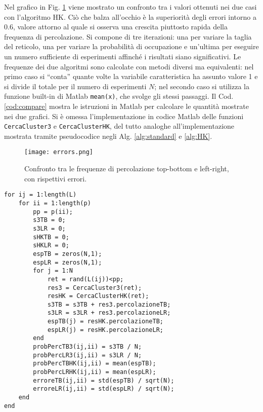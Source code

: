 Nel grafico in Fig. \ref{fig:th_errors} viene mostrato un confronto tra i valori 
ottenuti nei due casi con l'algoritmo HK. Ciò che balza all'occhio è la 
superiorità degli errori intorno a $0.6$, valore attorno al quale 
si osserva una crescita piuttosto rapida della frequenza di percolazione.
Si compone di tre iterazioni: una per variare la 
taglia del reticolo, una per variare la probabilità di occupazione e un'ultima per 
eseguire un numero sufficiente di esperimenti affinché i risultati siano significativi.
Le frequenze dei due algoritmi sono calcolate con metodi diversi ma equivalenti:
nel primo caso si ``conta'' quante volte la variabile caratteristica ha assunto valore 1
e si divide il totale per il numero di esperimenti $N$; nel secondo caso si utilizza la 
funzione built-in di Matlab \texttt{mean(x)}, che svolge gli stessi passaggi.
Il Cod. \ref{cod:compare} mostra le istruzioni in Matlab per calcolare le quantità 
mostrate nei due grafici. Si è omessa l'implementazione in codice Matlab delle funzioni 
\texttt{CercaCluster3} e \texttt{CercaClusterHK}, del tutto analoghe all'implementazione 
mostrata tramite pseudocodice negli Alg. \ref{alg:standard} e \ref{alg:HK}. \\


\begin{figure}[ht]
    \texttt{[image: errors.png]}
    \caption{Confronto tra le frequenze di percolazione top-bottom e left-right,
    con rispettivi errori.}
    \label{fig:th_errors}
\end{figure}
\begin{lstlisting}[caption={Porzione di codice relativa al confronto tra algoritmi e 
    alla frequenza di percolazione top-bottom e left-right.}, label={cod:compare}]
for ij = 1:length(L)
    for ii = 1:length(p)
        pp = p(ii);
        s3TB = 0;
        s3LR = 0;
        sHKTB = 0;
        sHKLR = 0;
        espTB = zeros(N,1);
        espLR = zeros(N,1);
        for j = 1:N
            ret = rand(L(ij))<pp;
            res3 = CercaCluster3(ret);
            resHK = CercaClusterHK(ret);
            s3TB = s3TB + res3.percolazioneTB;
            s3LR = s3LR + res3.percolazioneLR;
            espTB(j) = resHK.percolazioneTB;
            espLR(j) = resHK.percolazioneLR;
        end
        probPercTB3(ij,ii) = s3TB / N;
        probPercLR3(ij,ii) = s3LR / N;
        probPercTBHK(ij,ii) = mean(espTB);
        probPercLRHK(ij,ii) = mean(espLR);
        erroreTB(ij,ii) = std(espTB) / sqrt(N);
        erroreLR(ij,ii) = std(espLR) / sqrt(N);
    end
end
\end{lstlisting}

